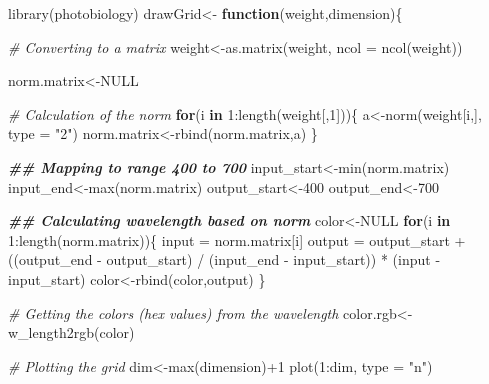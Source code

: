 \documentclass[
]{article}
\newenvironment{Shaded}{\begin{snugshade}}{\end{snugshade}}
\newcommand{\AttributeTok}[1]{\textcolor[rgb]{0.77,0.63,0.00}{#1}}
\newcommand{\CommentTok}[1]{\textcolor[rgb]{0.56,0.35,0.01}{\textit{#1}}}
\newcommand{\ConstantTok}[1]{\textcolor[rgb]{0.00,0.00,0.00}{#1}}
\newcommand{\ControlFlowTok}[1]{\textcolor[rgb]{0.13,0.29,0.53}{\textbf{#1}}}
\newcommand{\DecValTok}[1]{\textcolor[rgb]{0.00,0.00,0.81}{#1}}
\newcommand{\DocumentationTok}[1]{\textcolor[rgb]{0.56,0.35,0.01}{\textbf{\textit{#1}}}}
\newcommand{\FunctionTok}[1]{\textcolor[rgb]{0.00,0.00,0.00}{#1}}
\newcommand{\NormalTok}[1]{#1}
\newcommand{\OtherTok}[1]{\textcolor[rgb]{0.56,0.35,0.01}{#1}}
\newcommand{\SpecialCharTok}[1]{\textcolor[rgb]{0.00,0.00,0.00}{#1}}
\newcommand{\StringTok}[1]{\textcolor[rgb]{0.31,0.60,0.02}{#1}}
\begin{document}
\begin{Shaded}
\begin{Highlighting}[]
\FunctionTok{library}\NormalTok{(photobiology)}
\NormalTok{drawGrid}\OtherTok{\textless{}{-}} \ControlFlowTok{function}\NormalTok{(weight,dimension)\{}
  
  \CommentTok{\# Converting to a matrix}
\NormalTok{  weight}\OtherTok{\textless{}{-}}\FunctionTok{as.matrix}\NormalTok{(weight, }\AttributeTok{ncol =} \FunctionTok{ncol}\NormalTok{(weight))}
  
\NormalTok{  norm.matrix}\OtherTok{\textless{}{-}}\ConstantTok{NULL}
  
  \CommentTok{\# Calculation of the norm}
  \ControlFlowTok{for}\NormalTok{(i }\ControlFlowTok{in} \DecValTok{1}\SpecialCharTok{:}\FunctionTok{length}\NormalTok{(weight[,}\DecValTok{1}\NormalTok{]))\{}
\NormalTok{    a}\OtherTok{\textless{}{-}}\FunctionTok{norm}\NormalTok{(weight[i,], }\AttributeTok{type =} \StringTok{"2"}\NormalTok{)}
\NormalTok{    norm.matrix}\OtherTok{\textless{}{-}}\FunctionTok{rbind}\NormalTok{(norm.matrix,a)}
\NormalTok{  \}}
  
  \DocumentationTok{\#\# Mapping to range 400 to 700}
\NormalTok{  input\_start}\OtherTok{\textless{}{-}}\FunctionTok{min}\NormalTok{(norm.matrix)}
\NormalTok{  input\_end}\OtherTok{\textless{}{-}}\FunctionTok{max}\NormalTok{(norm.matrix)}
\NormalTok{  output\_start}\OtherTok{\textless{}{-}}\DecValTok{400}
\NormalTok{  output\_end}\OtherTok{\textless{}{-}}\DecValTok{700}
  
  
  \DocumentationTok{\#\# Calculating wavelength based on norm}
\NormalTok{  color}\OtherTok{\textless{}{-}}\ConstantTok{NULL}
  \ControlFlowTok{for}\NormalTok{(i }\ControlFlowTok{in} \DecValTok{1}\SpecialCharTok{:}\FunctionTok{length}\NormalTok{(norm.matrix))\{}
\NormalTok{    input }\OtherTok{=}\NormalTok{ norm.matrix[i]}
\NormalTok{    output }\OtherTok{=}\NormalTok{ output\_start }\SpecialCharTok{+}\NormalTok{ ((output\_end }\SpecialCharTok{{-}}\NormalTok{ output\_start) }\SpecialCharTok{/}\NormalTok{ (input\_end }\SpecialCharTok{{-}}\NormalTok{ input\_start)) }\SpecialCharTok{*}\NormalTok{ (input }\SpecialCharTok{{-}}\NormalTok{ input\_start)}
\NormalTok{    color}\OtherTok{\textless{}{-}}\FunctionTok{rbind}\NormalTok{(color,output)}
\NormalTok{  \}}
  
  \CommentTok{\# Getting the colors (hex values) from the wavelength}
\NormalTok{  color.rgb}\OtherTok{\textless{}{-}}\FunctionTok{w\_length2rgb}\NormalTok{(color)}
  
  
  \CommentTok{\# Plotting the grid}
\NormalTok{  dim}\OtherTok{\textless{}{-}}\FunctionTok{max}\NormalTok{(dimension)}\SpecialCharTok{+}\DecValTok{1}
  \FunctionTok{plot}\NormalTok{(}\DecValTok{1}\SpecialCharTok{:}\NormalTok{dim, }\AttributeTok{type =} \StringTok{"n"}\NormalTok{)}
  

\end{Highlighting}
\end{Shaded}
\end{document}

